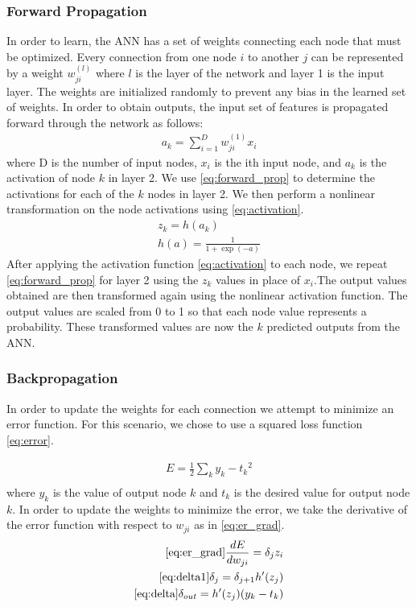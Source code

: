 \documentclass[11pt,letterpaper]{article}
\begin{document}
\subsubsection{Forward Propagation}
In order to learn, the ANN has a set of weights connecting each node that must be optimized. Every connection from one node $i$ to another $j$ can be represented by a weight $w_{ji}^{(l)}$ where $l$ is the layer of the network and layer 1 is the input layer. The weights are initialized randomly to prevent any bias in the learned set of weights. In order to obtain outputs, the input set of features is propagated forward through the network as follows:
\begin{align} \label{eq:forward_prop}
a_k = \sum_{i = 1}^{D}{w_{ji}^{(1)}x_i}
\end{align}
where D is the number of input nodes, $x_i$ is the ith input node, and $a_k$ is the activation of node $k$ in layer 2. We use \eqref{eq:forward_prop} to determine the activations for each of the $k$ nodes in layer 2. We then perform a nonlinear transformation on the node activations using \eqref{eq:activation}. 
\begin{align} \label{eq:activation}
z_k = h(a_k)\\
h(a) = \frac{1}{1+\exp{(-a)}}
\end{align}
After applying the activation function \eqref{eq:activation} to each node, we repeat \eqref{eq:forward_prop} for layer 2 using the $z_k$ values in place of $x_i$.The output values obtained are then transformed again using the nonlinear activation function. The output values are scaled from 0 to 1 so that each node value represents a probability. These transformed values are now the $k$ predicted outputs from the ANN.

\subsubsection{Backpropagation}
In order to update the weights for each connection we attempt to minimize an error function. For this scenario, we chose to use a squared loss function \eqref{eq:error}.

\begin{align} \label{eq:error}
E = \frac{1}{2}\sum_k{y_k - t_k}^2 \\
\end{align}
where $y_k$ is the value of output node $k$ and $t_k$ is the desired value for output node $k$. In order to update the weights to minimize the error, we take the derivative of the error function with respect to $w_{ji}$ as in \eqref{eq:er_grad}.
\begin{align} 
 \eqref{eq:er_grad}
\frac{dE}{dw_{ji}} = \delta_j{z_i}\\
\eqref{eq:delta1}
\delta_j = \delta_{j+1}h'(z_j)\\
\eqref{eq:delta}
\delta_{out} = h'(z_j)(y_k - t_k)
\end{align}
\end{document}
